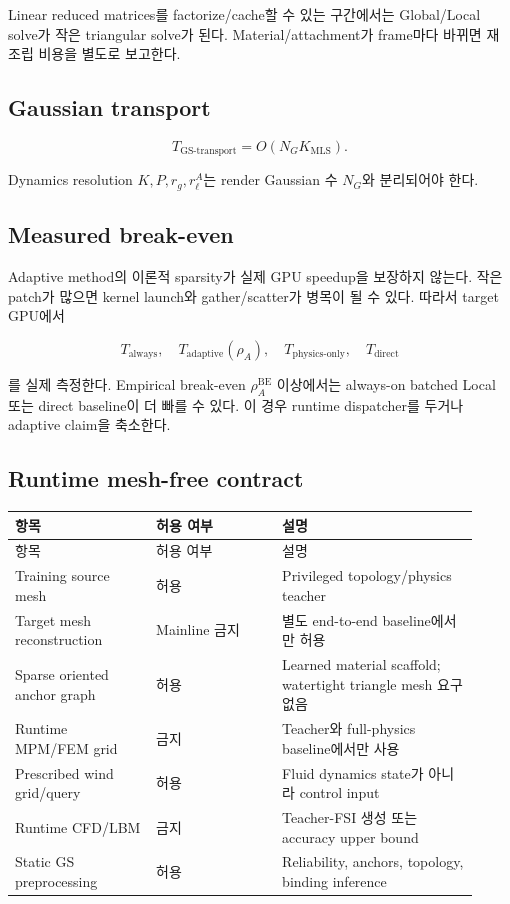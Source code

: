 \documentclass[11pt,a4paper]{article}
\begin{document}
Linear reduced matrices를 factorize/cache할 수 있는 구간에서는
Global/Local solve가 작은 triangular solve가 된다.
Material/attachment가 frame마다 바뀌면 재조립 비용을 별도로 보고한다.

\subsection{Gaussian transport}

\begin{equation}
  T_{\mathrm{GS\mbox{-}transport}}
  =
  O(N_GK_{\mathrm{MLS}}).
\end{equation}

Dynamics resolution \(K,P,r_g,r_\ell^A\)는 render Gaussian 수 \(N_G\)와 분리되어야 한다.

\subsection{Measured break-even}

Adaptive method의 이론적 sparsity가 실제 GPU speedup을 보장하지 않는다.
작은 patch가 많으면 kernel launch와 gather/scatter가 병목이 될 수 있다.
따라서 target GPU에서

\begin{equation}
  T_{\mathrm{always}},\quad
  T_{\mathrm{adaptive}}(\rho_A),\quad
  T_{\mathrm{physics\mbox{-}only}},\quad
  T_{\mathrm{direct}}
\end{equation}

를 실제 측정한다.
Empirical break-even \(\rho_A^{\mathrm{BE}}\) 이상에서는
always-on batched Local 또는 direct baseline이 더 빠를 수 있다.
이 경우 runtime dispatcher를 두거나 adaptive claim을 축소한다.

\subsection{Runtime mesh-free contract}

\begin{longtable}{L{0.28\linewidth}L{0.25\linewidth}L{0.39\linewidth}}
\toprule
항목 & 허용 여부 & 설명 \\
\midrule
\endfirsthead
\toprule
항목 & 허용 여부 & 설명 \\
\midrule
\endhead
Training source mesh & 허용 & Privileged topology/physics teacher \\
\addlinespace
Target mesh reconstruction & Mainline 금지 & 별도 end-to-end baseline에서만 허용 \\
\addlinespace
Sparse oriented anchor graph & 허용 & Learned material scaffold; watertight triangle mesh 요구 없음 \\
\addlinespace
Runtime MPM/FEM grid & 금지 & Teacher와 full-physics baseline에서만 사용 \\
\addlinespace
Prescribed wind grid/query & 허용 & Fluid dynamics state가 아니라 control input \\
\addlinespace
Runtime CFD/LBM & 금지 & Teacher-FSI 생성 또는 accuracy upper bound \\
\addlinespace
Static GS preprocessing & 허용 & Reliability, anchors, topology, binding inference \\
\bottomrule
\end{longtable}
\end{document}
